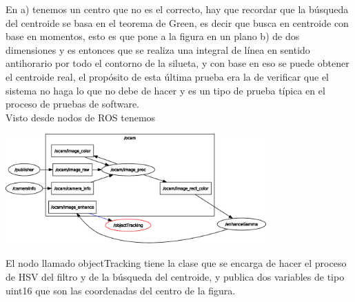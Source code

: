 En a) tenemos un centro que no es el correcto, hay que recordar que la búsqueda del centroide se basa en el teorema de Green,
es decir que busca en centroide con base en momentos, esto es que pone a la figura en un plano b) de dos dimensiones y es
entonces que se realiza una integral de línea en sentido antihorario por todo el contorno de la silueta, y con base en eso
se puede obtener el centroide real, el propósito de esta última prueba era la de verificar que el sistema no haga lo que
no debe de hacer y es un tipo de prueba típica en el proceso de pruebas de software.\\
Visto desde nodos de ROS tenemos
\begin{center}
	\includegraphics[width=0.75\textwidth]{Contenido/Cuerpo/Capitulo4/Fig30.eps}
	\label{Fig9}
\end{center}
El nodo llamado objectTracking tiene la clase que se encarga de hacer el proceso de HSV del filtro y de la búsqueda del
centroide, y publica dos variables de tipo uint16 que son las coordenadas del centro de la figura.